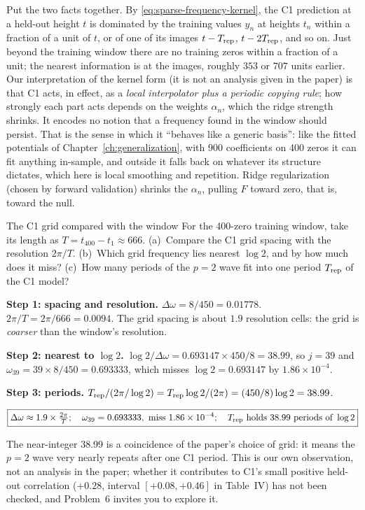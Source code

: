 Put the two facts together. By \eqref{eq:sparse-frequency-kernel}, the C1 prediction at a held-out height $t$ is dominated by the training values $y_n$ at heights $t_n$ within a fraction of a unit of $t$, or of one of its images $t-T_{\rm rep}$, $t-2T_{\rm rep}$, and so on. Just beyond the training window there are no training zeros within a fraction of a unit; the nearest information is at the images, roughly $353$ or $707$ units earlier. Our interpretation of the kernel form (it is not an analysis given in the paper) is that C1 acts, in effect, as a \emph{local interpolator plus a periodic copying rule}; how strongly each part acts depends on the weights $\alpha_n$, which the ridge strength shrinks. It encodes no notion that a frequency found in the window should persist. That is the sense in which it ``behaves like a generic basis'': like the fitted potentials of Chapter~\ref{ch:generalization}, with 900 coefficients on 400 zeros it can fit anything in-sample, and outside it falls back on whatever its structure dictates, which here is local smoothing and repetition. Ridge regularization (chosen by forward validation) shrinks the $\alpha_n$, pulling $F$ toward zero, that is, toward the null.

\begin{sample}{The C1 grid compared with the window}
For the 400-zero training window, take its length as $T=t_{400}-t_1\approx666$. (a)~Compare the C1 grid spacing with the resolution $2\pi/T$. (b)~Which grid frequency lies nearest $\log2$, and by how much does it miss? (c)~How many periods of the $p=2$ wave fit into one period $T_{\rm rep}$ of the C1 model?

\textbf{Step 1: spacing and resolution.} $\Delta\omega=8/450=0.01778$. $2\pi/T=2\pi/666=0.0094$. The grid spacing is about $1.9$ resolution cells: the grid is \emph{coarser} than the window's resolution.

\textbf{Step 2: nearest to $\log2$.} $\log2/\Delta\omega=0.693147\times450/8=38.99$, so $j=39$ and $\omega_{39}=39\times8/450=0.693333$, which misses $\log 2=0.693147$ by $1.86\times10^{-4}$.

\textbf{Step 3: periods.} $T_{\rm rep}/(2\pi/\log2)=T_{\rm rep}\log2/(2\pi)=(450/8)\log2=38.99$.

$$\boxed{\Delta\omega\approx1.9\times\tfrac{2\pi}{T};\quad \omega_{39}=0.693333,\ \text{miss }1.86\times10^{-4};\quad T_{\rm rep}\ \text{holds}\ 38.99\ \text{periods of}\ \log2}$$
\end{sample}

The near-integer 38.99 is a coincidence of the paper's choice of grid: it means the $p=2$ wave very nearly repeats after one C1 period. This is our own observation, not an analysis in the paper; whether it contributes to C1's small positive held-out correlation ($+0.28$, interval $[+0.08,+0.46]$ in Table~IV) has not been checked, and Problem~6 invites you to explore it.

